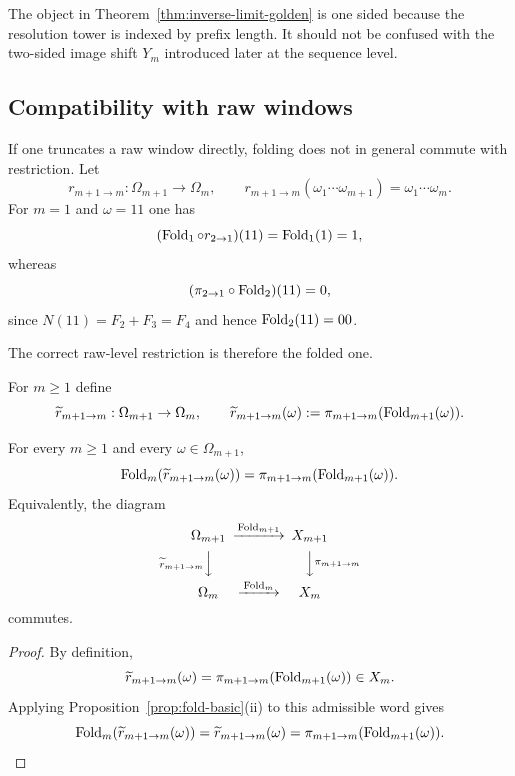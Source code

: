 \begin{remark}
The object in Theorem~\ref{thm:inverse-limit-golden} is one sided because the
resolution tower is indexed by prefix length.  It should not be confused with
the two-sided image shift $Y_m$ introduced later at the sequence level.
\end{remark}

\subsection{Compatibility with raw windows}

If one truncates a raw window directly, folding does not in general commute
with restriction.  Let
\[
r_{m+1\to m}:\Omega_{m+1}\to\Omega_m,
\qquad
r_{m+1\to m}(\omega_1\cdots\omega_{m+1})=\omega_1\cdots\omega_m.
\]
For $m=1$ and $\omega=11$ one has
\[
(\operatorname{Fold}_1\circ r_{2\to 1})(11)=\operatorname{Fold}_1(1)=1,
\]
whereas
\[
(\pi_{2\to 1}\circ \operatorname{Fold}_2)(11)=0,
\]
since $N(11)=F_2+F_3=F_4$ and hence $\operatorname{Fold}_2(11)=00$.

The correct raw-level restriction is therefore the folded one.

\begin{definition}
\label{def:fold-compatible-restriction}
For $m\ge 1$ define
\[
\widetilde r_{m+1\to m}:\Omega_{m+1}\to\Omega_m,
\qquad
\widetilde r_{m+1\to m}(\omega):=\pi_{m+1\to m}(\operatorname{Fold}_{m+1}(\omega)).
\]
\end{definition}

\begin{proposition}
\label{prop:fold-omega-commute}
For every $m\ge 1$ and every $\omega\in\Omega_{m+1}$,
\[
\operatorname{Fold}_m(\widetilde r_{m+1\to m}(\omega))
=
\pi_{m+1\to m}(\operatorname{Fold}_{m+1}(\omega)).
\]
Equivalently, the diagram
\[
\begin{CD}
\Omega_{m+1} @>{\Fold_{m+1}}>> X_{m+1}\\
@V{\widetilde r_{m+1\to m}}VV @VV{\pi_{m+1\to m}}V\\
\Omega_m @>{\Fold_m}>> X_m
\end{CD}
\]
commutes.
\end{proposition}

\begin{proof}
By definition,
\[
\widetilde r_{m+1\to m}(\omega)=\pi_{m+1\to m}(\operatorname{Fold}_{m+1}(\omega))\in X_m.
\]
Applying Proposition~\ref{prop:fold-basic}(ii) to this admissible word gives
\[
\operatorname{Fold}_m(\widetilde r_{m+1\to m}(\omega))
=
\widetilde r_{m+1\to m}(\omega)
=
\pi_{m+1\to m}(\operatorname{Fold}_{m+1}(\omega)).
\qedhere
\]
\end{proof}

